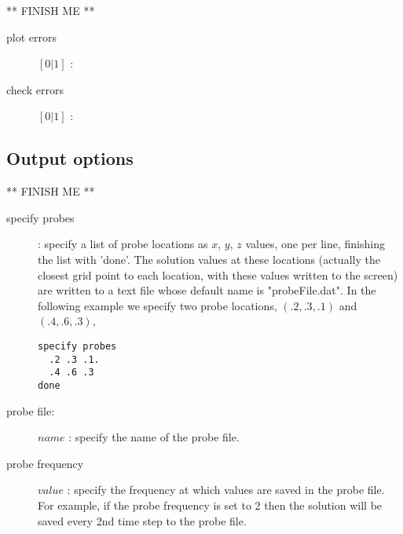 \documentclass[11pt]{article}
\begin{document}
** FINISH ME **

\begin{description}
  \item [\qquad plot errors] $[0|1]$ :
  \item [\qquad check errors] $[0|1]$ :
\end{description}

\subsection{Output options}

** FINISH ME **

\begin{description}
  \item [\qquad specify probes] : specify a list of probe locations as $x$, $y$, $z$ values, one per line, finishing the
         list with 'done'. The solution values at these locations (actually the closest grid point to each location, with these
         values written to the screen) are
    written to a text file whose default name is "probeFile.dat". 
    In the following example we specify two probe locations, $(.2,.3,.1)$ and $(.4,.6,.3)$, 
\begin{verbatim}
specify probes
  .2 .3 .1.
  .4 .6 .3
done
\end{verbatim}
  \item [\qquad probe file:] $name$ : specify the name of the probe file.
  \item [\qquad probe frequency] $value$ : specify the frequency at which values are saved in the probe file. For example,
      if the probe frequency is set to 2 then the solution will be saved every 2nd time step to the probe file. 
\end{description}





\vfill\eject



\printindex
\end{document}
